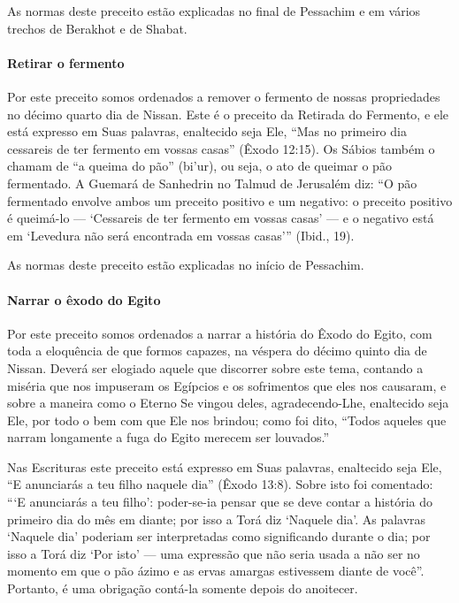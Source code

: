 As normas deste preceito estão explicadas no final de Pessachim e em
vários trechos de Berakhot e de Shabat.

\paragraph{Retirar o fermento}

Por este preceito somos ordenados a remover o fermento de nossas
propriedades no décimo quarto dia de Nissan. Este é o preceito da
Retirada do Fermento, e ele está expresso em Suas palavras, enaltecido seja Ele,
``Mas no primeiro dia cessareis de ter fermento em vossas casas'' (Êxodo 12:15).
Os Sábios também o chamam de ``a queima do pão'' (bi'ur), ou seja, o ato
de queimar o pão fermentado. A Guemará de Sanhedrin no Talmud de
Jerusalém diz: ``O pão fermentado envolve ambos um preceito positivo e um negativo: o
preceito positivo é queimá-lo --- `Cessareis de ter fermento em vossas
casas' --- e o negativo está em `Levedura não será encontrada em vossas casas'''
(Ibid., 19).

As normas deste preceito estão explicadas no início de Pessachim.

\paragraph{Narrar o êxodo do Egito}

Por este preceito somos ordenados a narrar a história do Êxodo do Egito,
com toda a eloquência de que formos capazes, na véspera do décimo quinto
dia de Nissan. Deverá ser elogiado aquele que discorrer sobre este tema,
contando a miséria que nos impuseram os Egípcios e os sofrimentos que
eles nos causaram, e sobre a maneira como o Eterno Se vingou deles,
agradecendo-Lhe, enaltecido seja Ele, por todo o bem com que Ele nos
brindou; como foi dito, ``Todos aqueles que narram longamente a fuga do
Egito merecem ser louvados.''

Nas Escrituras este preceito está expresso em Suas palavras, enaltecido
seja Ele, ``E anunciarás a teu filho naquele dia'' (Êxodo 13:8). Sobre
isto foi comentado: ```E anunciarás a teu filho': poder-se-ia pensar que
se deve contar a história do primeiro dia do mês em diante; por isso a
Torá diz `Naquele dia'. As palavras `Naquele dia' poderiam ser
interpretadas como significando durante o dia; por isso a Torá diz
`Por isto' --- uma expressão que não seria usada a não ser no momento em
que o pão ázimo e as ervas amargas estivessem diante de você''.
Portanto, é uma obrigação contá-la somente depois do anoitecer.

